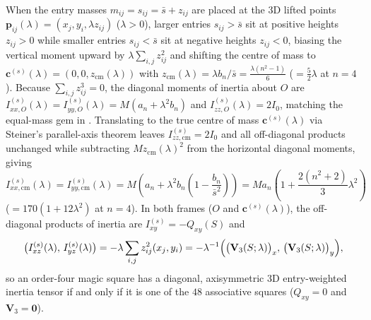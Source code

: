 \begin{theorem}
When the entry masses $m_{ij}=s_{ij}=\bar s+z_{ij}$ are placed at the 3D lifted points $\mathbf p_{ij}(\lambda)=(x_j,y_i,\lambda z_{ij})$ ($\lambda>0$), larger entries $s_{ij}>\bar s$ sit at positive heights $z_{ij}>0$ while smaller entries $s_{ij}<\bar s$ sit at negative heights $z_{ij}<0$, biasing the vertical moment upward by $\lambda\sum_{i,j}z_{ij}^2$ and shifting the centre of mass to $\mathbf c^{(s)}(\lambda)=(0,0,z_{\mathrm{cm}}(\lambda))$ with $z_{\mathrm{cm}}(\lambda)=\lambda b_n/\bar s=\frac{\lambda(n^2-1)}{6}$ ($=\frac52\lambda$ at $n=4$). Because $\sum_{i,j}z_{ij}^3=0$, the diagonal moments of inertia about $O$ are $I_{xx,O}^{(s)}(\lambda)=I_{yy,O}^{(s)}(\lambda)=M(a_n+\lambda^2 b_n)$ and $I_{zz,O}^{(s)}(\lambda)=2I_0$, matching the equal-mass gem in . Translating to the true centre of mass $\mathbf c^{(s)}(\lambda)$ via Steiner's parallel-axis theorem leaves $I_{zz,\mathrm{cm}}^{(s)}=2I_0$ and all off-diagonal products unchanged while subtracting $Mz_{\mathrm{cm}}(\lambda)^2$ from the horizontal diagonal moments, giving
\[
I_{xx,\mathrm{cm}}^{(s)}(\lambda) = I_{yy,\mathrm{cm}}^{(s)}(\lambda)
= M\!\left(a_n + \lambda^2 b_n\!\left(1 - \frac{b_n}{\bar s^2}\right)\right)
= M a_n\!\left(1 + \frac{2(n^2+2)}{3}\lambda^2\right)
\]
($=170(1+12\lambda^2)$ at $n=4$). In both frames ($O$ and $\mathbf c^{(s)}(\lambda)$), the off-diagonal products of inertia are $I_{xy}^{(s)}=-Q_{xy}(S)$ and
\[
\bigl(I_{xz}^{(s)}(\lambda),\, I_{yz}^{(s)}(\lambda)\bigr)
= -\lambda\sum_{i,j}z_{ij}^2(x_j,y_i)
= -\lambda^{-1}\Bigl(\bigl(\mathbf V_3(S;\lambda)\bigr)_x,\, \bigl(\mathbf V_3(S;\lambda)\bigr)_y\Bigr),
\]
so an order-four magic square has a diagonal, axisymmetric 3D entry-weighted inertia tensor if and only if it is one of the $48$ associative squares ($Q_{xy}=0$ and $\mathbf V_3=\mathbf 0$).
\end{theorem}

